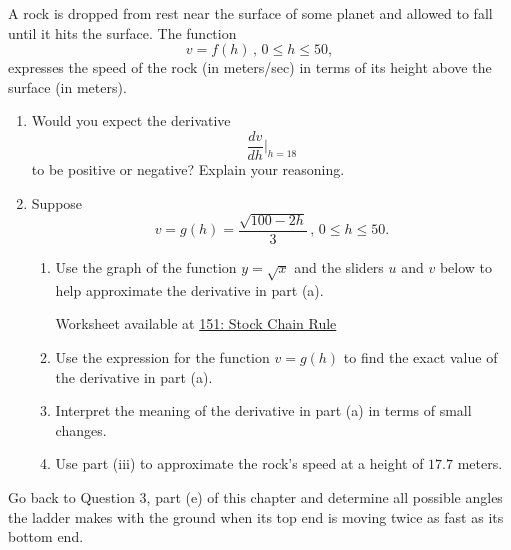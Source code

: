 \documentclass{ximera}
\begin{document}
\begin{question} \label{QLFMENEdefdes}
A rock is dropped from rest near the surface of some planet and allowed to fall until it hits the surface. The function
\[
  v = f(h) \, , \, 0\leq h \leq 50,
\]
expresses the speed of the rock (in meters/sec) in terms of its height above the surface (in meters).

\begin{enumerate}
\item Would you expect the derivative
\[
   \frac{dv}{dh}\Big|_{h=18}
\]
to be positive or negative? Explain your reasoning.

\item Suppose
\[
   v = g(h) = \frac{\sqrt{100-2h}}{3} \, , \, 0\leq h \leq 50.
\]
\begin{enumerate}

\item Use the graph of the function $y=\sqrt{x}$ and the sliders $u$ and $v$ below to help approximate the derivative in part (a).

\begin{onlineOnly}
    \begin{center}
\end{center}
\end{onlineOnly}

Worksheet available at \href{https://www.desmos.com/calculator/ilb4wptgxe}{151: Stock Chain Rule} 

\item Use the expression for the function $v=g(h)$ to find the exact value of the derivative in part (a).

\item Interpret the meaning of the derivative in part (a) in terms of small changes. 

\item Use part (iii) to approximate the rock's speed at a height of $17.7$ meters.


\end{enumerate}
\end{enumerate}

\begin{question} \label{QOERPERder}
Go back to Question 3, part (e) of this chapter and determine all possible angles the ladder makes with the ground when its top end is moving twice as fast as its bottom end.
\end{question}
\end{question}
\end{document}
